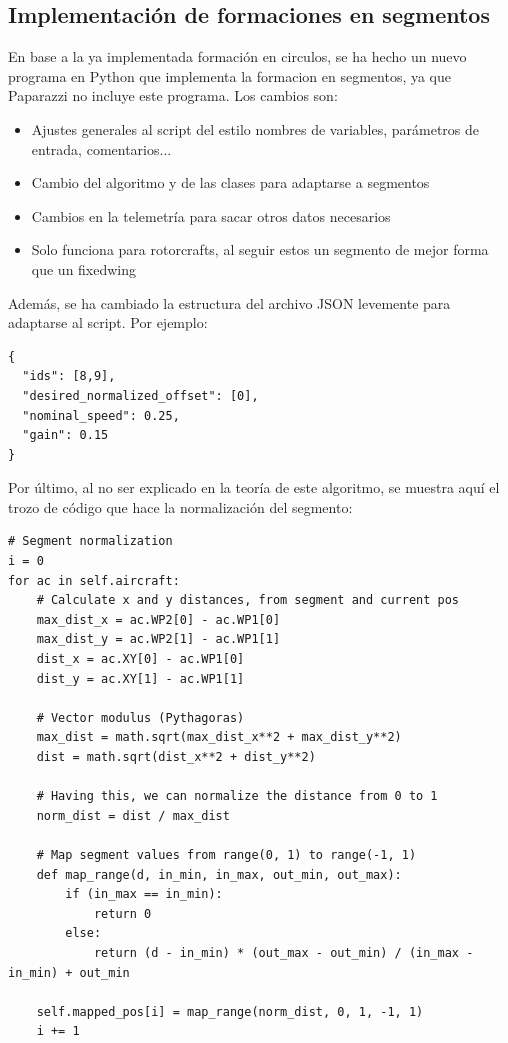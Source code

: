 \subsection{Implementación de formaciones en segmentos}

En base a la ya implementada formación en circulos, se ha hecho un nuevo
programa en Python que implementa la formacion en segmentos, ya que Paparazzi no incluye este programa. 
Los cambios son:

\begin{itemize}
    \item Ajustes generales al script del estilo nombres de variables, parámetros de entrada, comentarios...
    \item Cambio del algoritmo y de las clases para adaptarse a segmentos
    \item Cambios en la telemetría para sacar otros datos necesarios
    \item Solo funciona para rotorcrafts, al seguir estos un segmento de mejor forma que un fixedwing
\end{itemize}

Además, se ha cambiado la estructura del archivo JSON levemente para adaptarse al script. Por ejemplo:

\begin{lstlisting}[style=CodigoC]
{
  "ids": [8,9],
  "desired_normalized_offset": [0],
  "nominal_speed": 0.25,
  "gain": 0.15
}
\end{lstlisting}

Por último, al no ser explicado en la teoría de este algoritmo, 
se muestra aquí el trozo de código que hace la normalización del segmento:

\begin{lstlisting}[style=CodigoPython]
# Segment normalization
i = 0
for ac in self.aircraft:
    # Calculate x and y distances, from segment and current pos
    max_dist_x = ac.WP2[0] - ac.WP1[0]
    max_dist_y = ac.WP2[1] - ac.WP1[1]
    dist_x = ac.XY[0] - ac.WP1[0]
    dist_y = ac.XY[1] - ac.WP1[1]

    # Vector modulus (Pythagoras)
    max_dist = math.sqrt(max_dist_x**2 + max_dist_y**2)
    dist = math.sqrt(dist_x**2 + dist_y**2)

    # Having this, we can normalize the distance from 0 to 1
    norm_dist = dist / max_dist

    # Map segment values from range(0, 1) to range(-1, 1)
    def map_range(d, in_min, in_max, out_min, out_max):
        if (in_max == in_min):
            return 0
        else:
            return (d - in_min) * (out_max - out_min) / (in_max - in_min) + out_min
    
    self.mapped_pos[i] = map_range(norm_dist, 0, 1, -1, 1)
    i += 1
\end{lstlisting}

